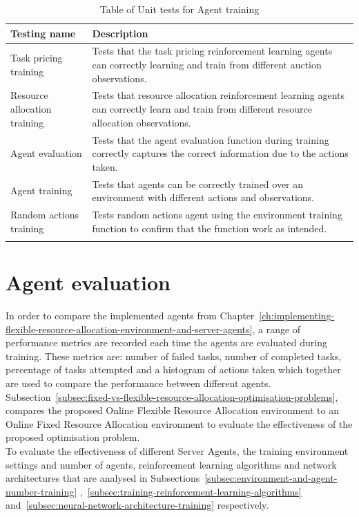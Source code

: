 \begin{longtable}{|p{3cm}|p{11cm}|} \hline
    \textbf{Testing name} & \textbf{Description} \\ \hline
    Task pricing training & Tests that the task pricing reinforcement learning agents can correctly learning and train
        from different auction observations. \\ \hline
    Resource allocation training & Tests that resource allocation reinforcement learning agents can correctly
        learn and train from different resource allocation observations. \\ \hline
    Agent evaluation & Tests that the agent evaluation function during training correctly captures the correct
        information due to the actions taken. \\ \hline
    Agent training & Tests that agents can be correctly trained over an environment with different actions and
        observations. \\ \hline
    Random actions training & Tests random actions agent using the environment training function to confirm
        that the function work as intended. \\ \hline
    \caption{Table of Unit tests for Agent training}
    \label{tab:training_testing}
\end{longtable}

\section{Agent evaluation}
\label{sec:agent-evaluation}
In order to compare the implemented agents from
Chapter~\ref{ch:implementing-flexible-resource-allocation-environment-and-server-agents}, a range of performance metrics
are recorded each time the agents are evaluated during training. These metrics are: number of failed tasks, number
of completed tasks, percentage of tasks attempted and a histogram of actions taken which together are used to compare the
performance between different agents. Subsection~\ref{subsec:fixed-vs-flexible-resource-allocation-optimisation-problems},
compares the proposed Online Flexible Resource Allocation environment to an Online Fixed Resource Allocation environment
to evaluate the effectiveness of the proposed optimisation problem. \\
To evaluate the effectiveness of different Server Agents, the training environment settings and
number of agents, reinforcement learning algorithms and network architectures that are analysed in
Subsections~\ref{subsec:environment-and-agent-number-training}
,~\ref{subsec:training-reinforcement-learning-algorithms} and~\ref{subsec:neural-network-architecture-training}
respectively.

